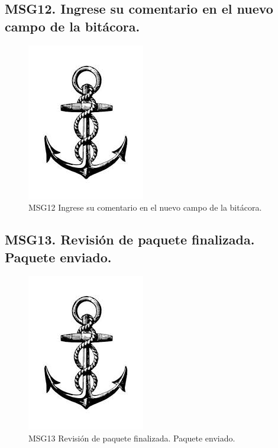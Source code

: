 \subsection{MSG12. Ingrese su comentario en el nuevo campo de la bitácora.}
    \begin{figure}[htbp]
        \begin{center}
            \includegraphics[width=.4\textwidth]{images/MSG/ancla}
            \caption{MSG12 Ingrese su comentario en el nuevo campo de la bitácora.}
            \label{fig:MSG12}
        \end{center}
    \end{figure}

\subsection{MSG13. Revisión de paquete finalizada. Paquete enviado.}
    \begin{figure}[htbp]
        \begin{center}
            \includegraphics[width=.4\textwidth]{images/MSG/ancla}
            \caption{MSG13 Revisión de paquete finalizada. Paquete enviado.}
            \label{fig:MSG13}
        \end{center}
    \end{figure}

